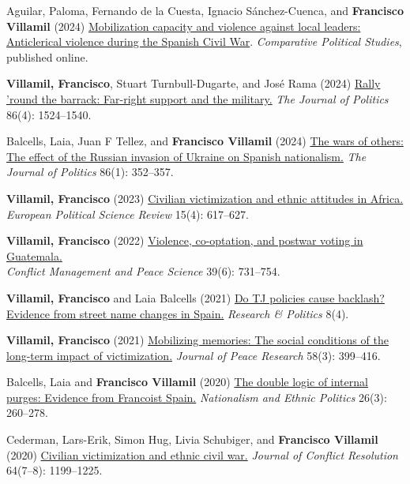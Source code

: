 \documentclass[a4paper, 12pt]{article}
\begin{document}
\begin{etaremune}[leftmargin=12pt, itemsep=0pt]
\item Aguilar, Paloma, Fernando de la Cuesta, Ignacio Sánchez-Cuenca, and \textbf{Francisco Villamil} (2024) \href{https://doi.org/10.1177/00104140241269894}{Mobilization capacity and violence against local leaders: Anticlerical violence during the Spanish Civil War}. \textit{Comparative Political Studies}, published online.
\item \textbf{Villamil, Francisco}, Stuart Turnbull-Dugarte, and José Rama (2024) \href{https://doi.org/10.1086/727598}{Rally 'round the barrack: Far-right support and the military.} \textit{The Journal of Politics} 86(4): 1524--1540.
\item Balcells, Laia, Juan F Tellez, and \textbf{Francisco Villamil} (2024) \href{https://doi.org/10.1086/726939}{The wars of others: The effect of the Russian invasion of Ukraine on Spanish nationalism.} \textit{The Journal of Politics} 86(1): 352--357.
\item \textbf{Villamil, Francisco} (2023) \href{https://doi.org/10.1017/S1755773923000097}{Civilian victimization and ethnic attitudes in Africa.}\\\textit{European Political Science Review} 15(4): 617--627.
\item \textbf{Villamil, Francisco} (2022) \href{https://journals.sagepub.com/doi/full/10.1177/07388942211066539}{Violence, co-optation, and postwar voting in Guatemala.}\\\textit{Conflict Management and Peace Science} 39(6): 731--754.
\item \textbf{Villamil, Francisco} and Laia Balcells (2021) \href{https://journals.sagepub.com/doi/full/10.1177/20531680211058550}{Do TJ policies cause backlash? Evidence from street name changes in Spain.} \textit{Research \& Politics} 8(4).
\item \textbf{Villamil, Francisco} (2021) \href{https://doi.org/10.1177/0022343320912816}{Mobilizing memories: The social conditions of the long-term impact of victimization.} \textit{Journal of Peace Research} 58(3): 399--416.
\item Balcells, Laia and \textbf{Francisco Villamil} (2020) \href{https://doi.org/10.1080/13537113.2020.1795451}{The double logic of internal purges: Evidence from Francoist Spain.} \textit{Nationalism and Ethnic Politics} 26(3): 260--278.
\item Cederman, Lars-Erik, Simon Hug, Livia Schubiger, and \textbf{Francisco Villamil} (2020) \href{https://doi.org/10.1177/0022002719898873}{Civilian victimization and ethnic civil war.} \textit{Journal of Conflict Resolution} 64(7--8): 1199--1225.
\end{etaremune}
\end{document}
